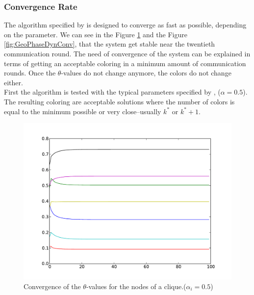 \documentclass[letterpaper]{article}
\begin{document}
\subsubsection{Convergence Rate}
The algorithm specified by \cite{HB10} is designed to converge as fast as possible, depending on the parameter. We can see in the Figure \ref{fig:GeoPhaseConv0.5} and the Figure \ref{fig:GeoPhaseDynConv}, that the system get stable near the twentieth communication round. The need of convergence of the system can be explained in terms of getting an acceptable coloring in a minimum amount of communication rounds. Once the $\theta$-values do not change anymore, the colors do not change either.\\
First the algorithm is tested with the typical parameters specified by \cite{HB10}, ($\alpha = 0.5$). The resulting coloring are acceptable solutions where the number of colors is equal to the minimum possible or very close--usually $k^*$ or $k^*+1$.
\begin{figure}[h]
\centering
\includegraphics[scale=0.4]{./Figures/alpha_50.pdf}
\caption{Convergence of the $\theta$-values for the nodes of a clique.($\alpha_i = 0.5$)} \label{fig:GeoPhaseConv0.5}
\end{figure}
\end{document}
